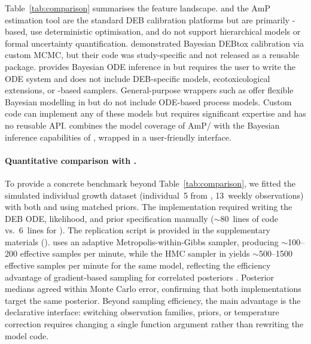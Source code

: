 \documentclass[article,shortnames]{jss}
\begin{document}
Table~\ref{tab:comparison} summarises the feature landscape.
 and the AmP estimation tool \citep{MarquesAmP2018}
are the standard DEB calibration platforms but are primarily
-based, use deterministic optimisation, and do not support
hierarchical models or formal uncertainty quantification.
\citet{BilloirBayesDEB2008} demonstrated Bayesian DEBtox calibration
via custom MCMC, but their code was study-specific and not released as
a reusable package.
 \citep{deBInfer2017} provides Bayesian ODE inference in
 but requires the user to write the ODE system and does
not include DEB-specific models, ecotoxicological extensions, or
-based samplers.
General-purpose  wrappers such as
 \citep{Burknerbrms2017} offer flexible Bayesian modelling
in  but do not include ODE-based process models.
Custom  code can
implement any of these models but requires significant expertise and
has no reusable API.   combines the model coverage of
AmP/ with the Bayesian inference capabilities of
, wrapped in a user-friendly  interface.

\paragraph{Quantitative comparison with .}
To provide a concrete benchmark beyond
Table~\ref{tab:comparison}, we fitted the simulated
individual growth dataset (individual~5 from
, 13~weekly observations) with both
 and  \citep{deBInfer2017}
using matched priors.  The  implementation
required writing the DEB ODE, likelihood, and prior
specification manually ($\sim$80~lines of 
code vs.\ 6~lines for ).  The replication
script is provided in the supplementary materials
().
 uses an adaptive Metropolis-within-Gibbs
sampler, producing $\sim$100--200 effective samples per
minute, while the HMC sampler in  yields
$\sim$500--1500 effective samples per minute for the same
model, reflecting the efficiency advantage of gradient-based
sampling for correlated posteriors
\citep{BetancourtHierarchical2015}.  Posterior medians agreed
within Monte Carlo error, confirming that both implementations
target the same posterior.  Beyond sampling efficiency, the
main advantage is the declarative interface: switching
observation families, priors, or temperature correction
requires changing a single function argument rather than
rewriting the model code.
\end{document}

